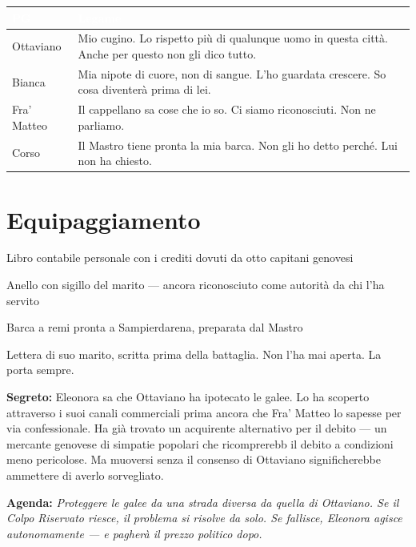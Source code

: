 \begin{table}[h]
\centering\renewcommand{\arraystretch}{1.4}
\begin{tabularx}{\linewidth}{@{}L{2.4cm} X@{}}
  \toprule{}
  \textcolor{white}{\textbf{PG}} & \textcolor{white}{\textbf{Legame}} \\
  \midrule
  Ottaviano & Mio cugino. Lo rispetto più di qualunque uomo in questa città. Anche per questo non gli dico tutto. \\
  Bianca & Mia nipote di cuore, non di sangue. L'ho guardata crescere. So cosa diventerà prima di lei. \\
  Fra' Matteo & Il cappellano sa cose che io so. Ci siamo riconosciuti. Non ne parliamo. \\
  Corso & Il Mastro tiene pronta la mia barca. Non gli ho detto perché. Lui non ha chiesto. \\
  \bottomrule
\end{tabularx}
\end{table}

\section*{Equipaggiamento}
\begin{goldlist}
  \item Libro contabile personale con i crediti dovuti da otto capitani genovesi
  \item Anello con sigillo del marito — ancora riconosciuto come autorità da chi l'ha servito
  \item Barca a remi pronta a Sampierdarena, preparata dal Mastro
  \item Lettera di suo marito, scritta prima della battaglia. Non l'ha mai aperta. La porta sempre.
\end{goldlist}


\begin{secretbox}
  \textbf{Segreto:} Eleonora sa che Ottaviano ha ipotecato le galee. Lo ha scoperto
  attraverso i suoi canali commerciali prima ancora che Fra' Matteo lo sapesse per
  via confessionale. Ha già trovato un acquirente alternativo per il debito —
  un mercante genovese di simpatie popolari che ricomprerebb il debito a condizioni
  meno pericolose. Ma muoversi senza il consenso di Ottaviano significherebbe
  ammettere di averlo sorvegliato.

  \medskip\noindent\textcolor{SecretRed}{\textbf{Agenda:}}
  \textit{Proteggere le galee da una strada diversa da quella di Ottaviano.
  Se il Colpo Riservato riesce, il problema si risolve da solo. Se fallisce,
  Eleonora agisce autonomamente — e pagherà il prezzo politico dopo.}
\end{secretbox}

